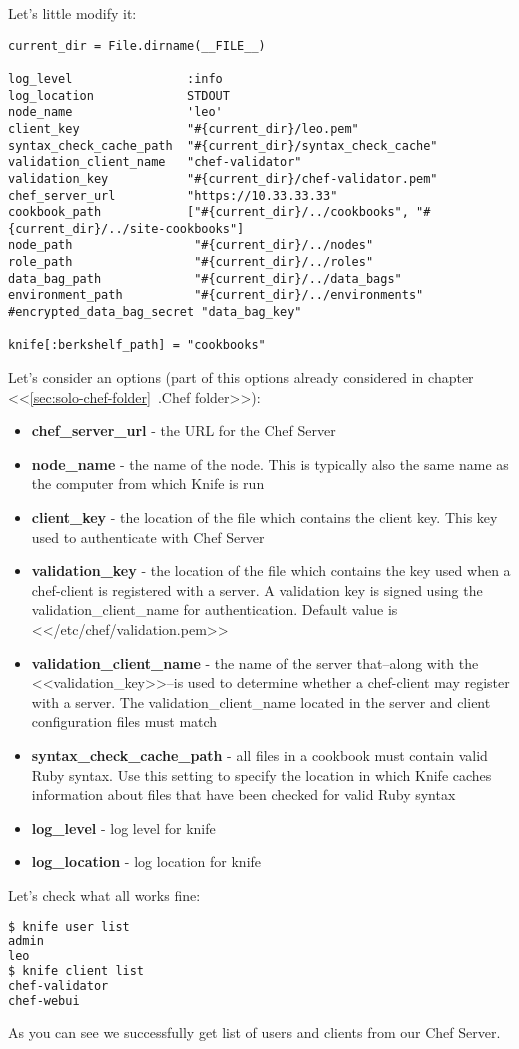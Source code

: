 Let's little modify it:

\begin{lstlisting}[label=lst:my-server-cloud-knife4,title=my-server-cloud/.chef/knife.rb]
current_dir = File.dirname(__FILE__)

log_level                :info
log_location             STDOUT
node_name                'leo'
client_key               "#{current_dir}/leo.pem"
syntax_check_cache_path  "#{current_dir}/syntax_check_cache"
validation_client_name   "chef-validator"
validation_key           "#{current_dir}/chef-validator.pem"
chef_server_url          "https://10.33.33.33"
cookbook_path            ["#{current_dir}/../cookbooks", "#{current_dir}/../site-cookbooks"]
node_path                 "#{current_dir}/../nodes"
role_path                 "#{current_dir}/../roles"
data_bag_path             "#{current_dir}/../data_bags"
environment_path          "#{current_dir}/../environments"
#encrypted_data_bag_secret "data_bag_key"

knife[:berkshelf_path] = "cookbooks"
\end{lstlisting}

Let's consider an options (part of this options already considered in chapter <<\ref{sec:solo-chef-folder}~.Chef folder>>):

\begin{itemize}
  \item \textbf{chef\_server\_url} - the URL for the Chef Server
  \item \textbf{node\_name} - the name of the node. This is typically also the same name as the computer from which Knife is run
  \item \textbf{client\_key} - the location of the file which contains the client key. This key used to authenticate with Chef Server
  \item \textbf{validation\_key} - the location of the file which contains the key used when a chef-client is registered with a server. A validation key is signed using the validation\_client\_name for authentication. Default value is <</etc/chef/validation.pem>>
  \item \textbf{validation\_client\_name} - the name of the server that–along with the <<validation\_key>>–is used to determine whether a chef-client may register with a server. The validation\_client\_name located in the server and client configuration files must match
  \item \textbf{syntax\_check\_cache\_path} - all files in a cookbook must contain valid Ruby syntax. Use this setting to specify the location in which Knife caches information about files that have been checked for valid Ruby syntax
  \item \textbf{log\_level} - log level for knife
  \item \textbf{log\_location} - log location for knife
\end{itemize}

Let's check what all works fine:

\begin{lstlisting}[language=Bash,label=lst:my-server-cloud-knife5]
$ knife user list
admin
leo
$ knife client list
chef-validator
chef-webui
\end{lstlisting}

As you can see we successfully get list of users and clients from our Chef Server.
